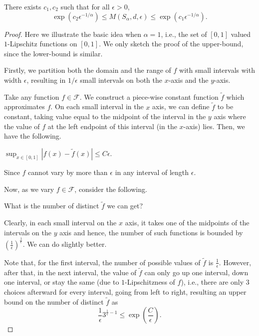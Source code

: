\begin{theorem}\label{thm:metric-entropy}
  There exists \(c_1, c_2\) such that for all \(\epsilon > 0\),
  \[
    \exp \left( c_2 \epsilon ^{-1 / \alpha } \right)
    \leq M(S_\alpha , d, \epsilon )
    \leq \exp \left( c_1 \epsilon ^{-1 / \alpha } \right) .
  \]
\end{theorem}
\begin{proof}
  Here we illustrate the basic idea when \(\alpha = 1\), i.e., the set of \([0,1]\) valued \(1\)-Lipschitz functions on \([0,1]\). We only sketch the proof of the upper-bound, since the lower-bound is similar.

  Firstly, we partition both the domain and the range of \(f\) with small intervals with width \(\epsilon\), resulting in \(1/\epsilon\) small intervals on both the \(x\)-axis and the \(y\)-axis.

  Take any function \(f \in \mathscr{F} \). We construct a piece-wise constant function \(\widetilde{f}\) which approximates \(f\). On each small interval in the \(x\) axis, we can define \(\widetilde{f}\) to be constant, taking value equal to the midpoint of the interval in the \(y\) axis where the value of \(f\) at the left endpoint of this interval (in the \(x\)-axis) lies. Then, we have the following.
  \begin{claim}
    \(\sup_{x \in [0,1]} |f(x) - \widetilde{f}(x)| \leq C \epsilon\).
  \end{claim}
  \begin{explanation}
    Since \(f\) cannot vary by more than \(\epsilon\) in any interval of length \(\epsilon\).
  \end{explanation}

  Now, as we vary \(f \in \mathscr{F} \), consider the following.

  \begin{problem*}
    What is the number of distinct \(\widetilde{f}\) we can get?
  \end{problem*}
  \begin{answer}
    Clearly, in each small interval on the \(x\) axis, it takes one of the midpoints of the intervals on the \(y\) axis and hence, the number of such functions is bounded by \((\frac{1}{\epsilon})^{\frac{1}{\epsilon}}\). We can do slightly better.
  \end{answer}

  Note that, for the first interval, the number of possible values of \(\widetilde{f}\) is \(\frac{1}{\epsilon}\). However, after that, in the next interval, the value of \(\widetilde{f}\) can only go up one interval, down one interval, or stay the same (due to \(1\)-Lipschitzness of \(f\)), i.e., there are only \(3\) choices afterward for every interval, going from left to right, resulting an upper bound on the number of distinct \(\widetilde{f}\) as
  \[
    \frac{1}{\epsilon} 3^{\frac{1}{\epsilon} - 1} \leq \exp(\frac{C}{\epsilon}).
  \]
\end{proof}

